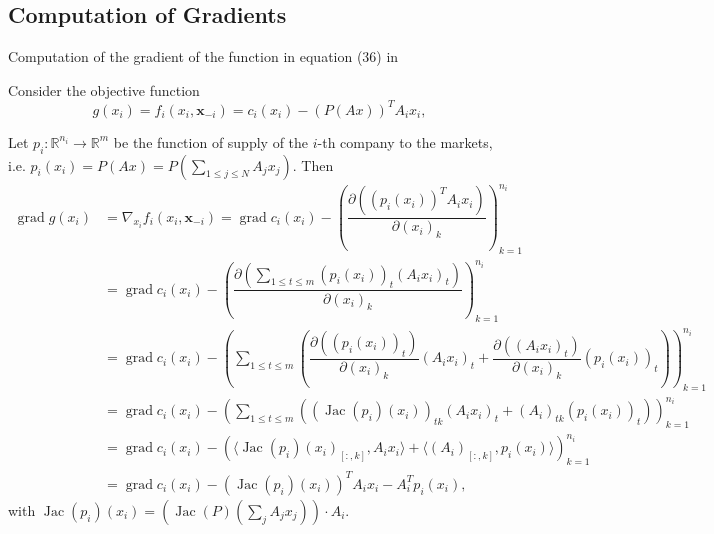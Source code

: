 \subsection*{Computation of Gradients}

Computation of the gradient of the function in equation (36) in \citep{Yi_2019}

Consider the objective function
$$g(x_i) = f_i(x_i, \mathbf{x}_{-i}) = c_i(x_i) - (P(Ax))^T A_ix_i,$$

Let $p_i: \mathbb{R}^{n_i} \to \mathbb{R}^m$ be the function of supply of the $i$-th company to the markets, i.e. $p_i(x_i) = P(Ax) = P\left(\sum\limits_{1 \leqslant j \leqslant N} A_jx_j\right)$. Then
\begin{align*}
\operatorname{grad} g(x_i) & = \nabla_{x_i} f_i(x_i, \mathbf{x}_{-i}) = \operatorname{grad} c_i(x_i) - \left( \dfrac{\partial \left( (p_i(x_i))^T A_ix_i \right)}{\partial (x_i)_k} \right)_{k=1}^{n_i} \\
& = \operatorname{grad} c_i(x_i) - \left( \dfrac{\partial \left( \sum\limits_{1\leqslant t \leqslant m} (p_i(x_i))_t (A_ix_i)_t \right)}{\partial (x_i)_k} \right)_{k=1}^{n_i} \\
& = \operatorname{grad} c_i(x_i) - \left( \sum\limits_{1\leqslant t \leqslant m}\left( \dfrac{\partial \left( (p_i(x_i))_t \right)}{\partial (x_i)_k} (A_ix_i)_t + \dfrac{\partial \left( (A_ix_i)_t \right)}{\partial (x_i)_k} (p_i(x_i))_t \right) \right)_{k=1}^{n_i} \\
& = \operatorname{grad} c_i(x_i) - \left( \sum\limits_{1\leqslant t \leqslant m}\left( \left(\operatorname{Jac} (p_i)(x_i) \right)_{tk} (A_ix_i)_t + (A_i)_{tk} (p_i(x_i))_t \right) \right)_{k=1}^{n_i} \\
& = \operatorname{grad} c_i(x_i) - \left( \langle \operatorname{Jac}(p_i)(x_i)_{[:,k]}, A_ix_i \rangle + \langle (A_i)_{[:,k]}, p_i(x_i) \rangle \right)_{k=1}^{n_i} \\
& =\operatorname{grad} c_i(x_i) - \left( \operatorname{Jac}(p_i)(x_i) \right)^T A_ix_i - A_i^T p_i(x_i),
\end{align*}
with $\operatorname{Jac}(p_i)(x_i) = \left( \operatorname{Jac}(P)\left(\sum\limits_j A_jx_j\right) \right) \cdot A_i$.

